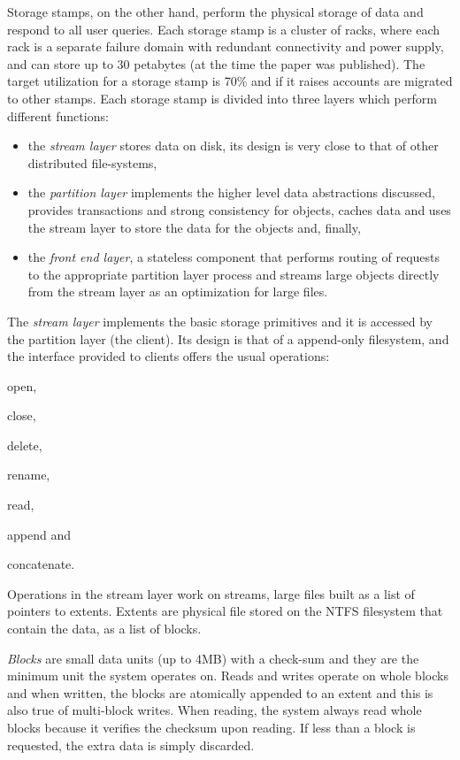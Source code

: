 Storage stamps, on the other hand, perform the physical storage of data and respond to all user queries.
Each storage stamp is a cluster of racks, where each rack is a separate failure domain with redundant connectivity and power supply, and can store up to 30 petabytes (at the time the paper was published).
The target utilization for a storage stamp is 70\% and if it raises accounts are migrated to other stamps.
Each storage stamp is divided into three layers which perform different functions:
\begin{itemize}
    \item the \emph{stream layer} stores data on disk, its design is very close to that of other distributed file-systems,
    \item the \emph{partition layer} implements the higher level data abstractions discussed, provides transactions and strong consistency for objects, caches data and uses the stream layer to store the data for the objects and, finally,
    \item the \emph{front end layer}, a stateless component that performs routing of requests to the appropriate partition layer process and streams large objects directly from the stream layer as an optimization for large files.
\end{itemize}

The \emph{stream layer} implements the basic storage primitives and it is accessed by the partition layer (the client).
Its design is that of a append-only filesystem, and the interface provided to clients offers the usual operations:
\begin{inparaenum}[i)]
    \item open,
    \item close,
    \item delete,
    \item rename,
    \item read,
    \item append and
    \item concatenate.
\end{inparaenum}
Operations in the stream layer work on streams, large files built as a list of pointers to extents.
Extents are physical file stored on the NTFS filesystem that contain the data, as a list of blocks.

\emph{Blocks} are small data units (up to 4MB) with a check-sum and they are the minimum unit the system operates on.
Reads and writes operate on whole blocks and when written, the blocks are atomically appended to an extent and this is also true of multi-block writes.
When reading, the system always read whole blocks because it verifies the checksum upon reading.
If less than a block is requested, the extra data is simply discarded.

